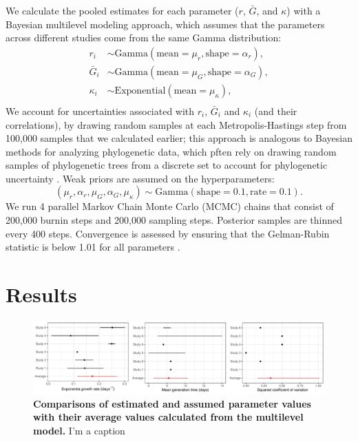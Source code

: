 \documentclass[12pt]{article}
\begin{document}
We calculate the pooled estimates for each parameter ($r$, $\bar G$, and $\kappa$) with a Bayesian multilevel modeling approach, which assumes that the parameters across different studies come from the same Gamma distribution:
\begin{equation}
\begin{aligned}
r_i &\sim \mathrm{Gamma}(\mathrm{mean}=\mu_r, \mathrm{shape}=\alpha_r),\\
\bar{G}_i &\sim \mathrm{Gamma}(\mathrm{mean}=\mu_G, \mathrm{shape}=\alpha_G),\\
\kappa_i &\sim \mathrm{Exponential}(\mathrm{mean}=\mu_\kappa),\\
\end{aligned}
\end{equation}
We account for uncertainties associated with $r_i$, $\bar G_i$ and $\kappa_i$ (and their correlations), by drawing random samples at each Metropolis-Hastings step from 100,000 samples that we calculated earlier;
this approach is analogous to Bayesian methods for analyzing phylogenetic data, which pften rely on drawing random samples of phylogenetic trees from a discrete set to account for phylogenetic uncertainty \citep{pagel2004bayesian,bedford2014integrating}.
Weak priors are assumed on the hyperparameters:
\begin{equation}
(\mu_r, \alpha_r, \mu_G, \alpha_G, \mu_\kappa) \sim \mathrm{Gamma}(\mathrm{shape}=0.1, \mathrm{rate}=0.1).
\end{equation}
We run 4 parallel Markov Chain Monte Carlo (MCMC) chains that consist of 200,000 burnin steps and 200,000 sampling steps.
Posterior samples are thinned every 400 steps.
Convergence is assessed by ensuring that the Gelman-Rubin statistic is below 1.01 for all parameters \citep{gelman1992inference}.

\section{Results}

\begin{figure}[!ht]
\includegraphics[width=\textwidth]{compare_assumption.pdf}
\caption{
\textbf{Comparisons of estimated and assumed parameter values with their average values calculated from the multilevel model.}
I'm a caption
}
\label{fig:assumption}
\end{figure}
\end{document}
